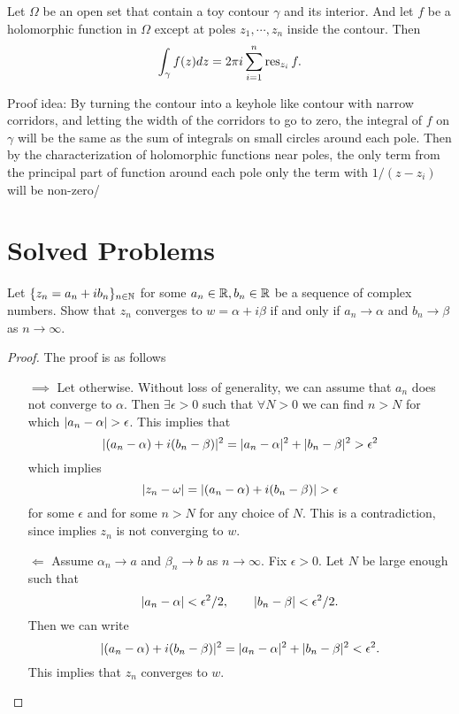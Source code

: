 \begin{theorem}
	Let $ \Omega $ be an open set that contain a toy contour $ \gamma $ and its interior. And let $ f $ be a holomorphic function in $ \Omega $ except at poles $ z_1,\cdots,z_n $ inside the contour. Then
	\[ \int_\gamma f(z)dz = 2\pi i \sum_{i=1}^n \operatorname{res}_{z_i}f. \]
\end{theorem}
\begin{remark}
	Proof idea: By turning the contour into a keyhole like contour with narrow corridors, and letting the width of the corridors to go to zero, the integral of $ f $ on $ \gamma $ will be the same as the sum of integrals on small circles around each pole. Then by the characterization of holomorphic functions near poles, the only term from the principal part of function around each pole only the term with $ 1/(z-z_i) $ will be non-zero/
\end{remark}



\newpage

\section{Solved Problems}

\begin{problem}
	Let $ \{z_n = a_n + i b_n\}_{n\in\mathbb{N}} $ for some $ a_n \in \mathbb{R}, b_n \in \mathbb{R} $  be a sequence of complex numbers. Show that $ z_n $ converges to $ w = \alpha + i\beta $ if and only if $ a_n \to \alpha $ and $ b_n \to \beta $ as $ n\to \infty $.
\end{problem}

\begin{proof}
	The proof is as follows
	\begin{itemize}
		\item[$\boxed{ \implies }$] Let otherwise. Without loss of generality, we can assume that $ a_n $ does not converge to $ \alpha $. Then $ \exists \epsilon>0 $ such that $ \forall N>0 $ we can find $ n>N $ for which $ |a_n - \alpha| > \epsilon $. This implies that
		\[ |(a_n - \alpha) + i(b_n - \beta)|^2 = |a_n-\alpha|^2 + |b_n - \beta|^2  > \epsilon^2 \]
		which implies
		\[ |z_n - \omega|=|(a_n - \alpha) + i(b_n - \beta)| > \epsilon \]
		for some $ \epsilon $ and for some $ n>N $ for any choice of $ N $. This is a contradiction, since implies $ z_n $ is not converging to $ w $.
		\item[$ \boxed{\Longleftarrow} $] Assume $ \alpha_n \to a $ and $ \beta_n \to b $ as $ n\to \infty $. Fix $ \epsilon>0 $. Let $ N $ be large enough such that 
		\[ |a_n - \alpha|< \epsilon^2/2, \qquad |b_n - \beta|< \epsilon^2/2. \]
		Then we can write
		\[ |(a_n-\alpha) + i(b_n - \beta)|^2 = |a_n-\alpha|^2 + |b_n - \beta|^2 < \epsilon^2. \]
		This implies that $ z_n $ converges to $ w $.
	\end{itemize}
\end{proof}

